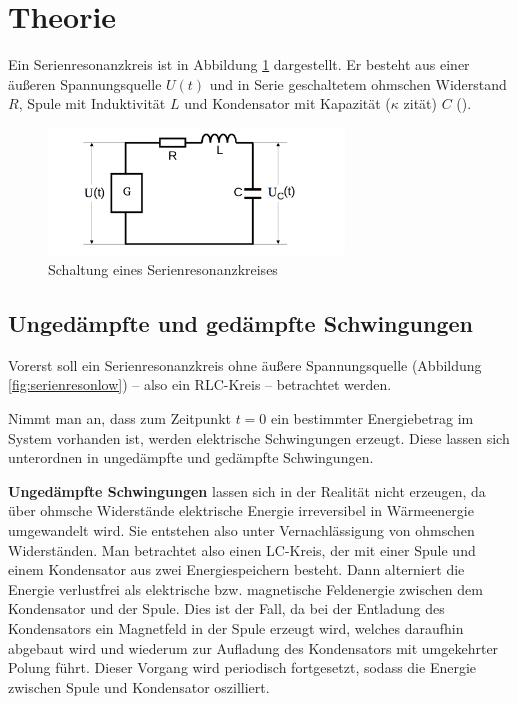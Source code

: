\section{Theorie}
\label{sec:Theorie}


Ein Serienresonanzkreis ist in Abbildung \ref{fig:serienreson} dargestellt.
Er besteht aus einer äußeren Spannungsquelle $U(t)$ und in Serie 
geschaltetem ohmschen Widerstand $R$, Spule mit Induktivität $L$ und Kondensator 
mit Kapazität ($\kappa$ zität) $C$ (\cite{noltingbro}).

\begin{figure}
	\centering
	\includegraphics[width=0.7\textwidth]{Bilder/Aufbau.png}
	\caption{Schaltung eines Serienresonanzkreises \cite{Anleitung}}
	\label{fig:serienreson}
\end{figure}


\subsection{Ungedämpfte und gedämpfte Schwingungen}

Vorerst soll ein Serienresonanzkreis ohne äußere Spannungsquelle (Abbildung \ref{fig:serienresonlow}) -- also ein RLC-Kreis -- betrachtet werden.

Nimmt man an, dass zum Zeitpunkt $t=0$ ein bestimmter Energiebetrag im System vorhanden ist, 
werden elektrische Schwingungen erzeugt.
Diese lassen sich unterordnen in ungedämpfte und gedämpfte Schwingungen.

\textbf{Ungedämpfte Schwingungen} lassen sich in der Realität nicht erzeugen, da über ohmsche 
Widerstände elektrische Energie irreversibel in Wärmeenergie umgewandelt wird.
Sie entstehen also unter Vernachlässigung von ohmschen Widerständen.
Man betrachtet also einen LC-Kreis, der mit einer Spule und einem Kondensator aus zwei 
Energiespeichern besteht. 
Dann alterniert die Energie verlustfrei als elektrische bzw. magnetische Feldenergie zwischen dem Kondensator und der Spule. 
Dies ist der Fall, da bei der Entladung des Kondensators ein Magnetfeld in der Spule erzeugt 
wird, welches daraufhin abgebaut wird und wiederum zur Aufladung des Kondensators mit 
umgekehrter Polung führt. Dieser Vorgang wird periodisch fortgesetzt, sodass die Energie zwischen Spule und Kondensator oszilliert.

